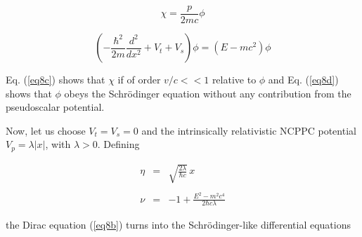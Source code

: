 \documentclass[a4paper,12pt,titlepage]{article}
\begin{document}
\begin{equation}
\chi =\frac{p}{2mc}\phi  \label{eq8c}
\end{equation}

\begin{equation}
\left( -\frac{\hbar ^{2}}{2m}\frac{d^{2}}{dx^{2}}+V_{t}+V_{s}\right) \phi
=\left( E-mc^{2}\right) \phi  \label{eq8d}
\end{equation}

\noindent Eq. (\ref{eq8c}) shows that $\chi $ if of order $v/c<<1$ relative
to $\phi $ and Eq. (\ref{eq8d}) shows that $\phi $ obeys the Schr\"{o}dinger
equation without any contribution from the pseudoscalar potential.

Now, let us choose $V_{t}=V_{s}=0$ and the intrinsically relativistic NCPPC
potential $V_{p}=\lambda |x|$, with $\lambda >0$. Defining

\begin{eqnarray}
\eta &=&\sqrt{\frac{2\lambda }{\hbar c}}\,x  \label{eq8f1} \\
&&  \nonumber \\
\nu &=&-1+\frac{E^{2}-m^{2}c^{4}}{2\hbar c\lambda }  \label{eq8f}
\end{eqnarray}

\smallskip \noindent \noindent the Dirac equation (\ref{eq8b}) turns into
the Schr\"{o}dinger-like differential equations
\end{document}

